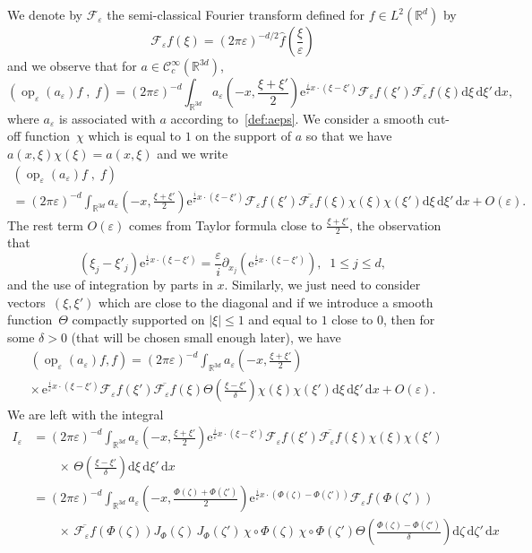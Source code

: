 \documentclass[AHL,Unicode,longabstracts]{cedram}
\DeclareMathOperator{\op}{op}
\newcommand*\R{{\mathbb R}}
\newcommand*\eps{\varepsilon}
\numberwithin{equation}{section}
\newcommand{\ee}{{\mathrm e}}
\newcommand*{\dd}{\mathrm{d}}
\newcommand*{\dx}{\dd x}
\newcommand*{\dxi}{\dd \xi}
\newcommand*{\dzeta}{\dd \zeta}
\begin{document}
We denote by ${\mathcal F}_\eps$ the semi-classical Fourier transform defined for $f\in L^2(\R^d)$ by
\[
{\mathcal F}_\eps f(\xi)=(2\pi\eps)^{-d/2} \widehat f\left(\frac{\xi}{\eps}\right)
\]
and we observe that for $a\in{\mathcal C}_c^\infty(\R^{3d})$,
\[
\left(\op_\eps(a_\eps)f\;,\;f\right)=(2\pi\eps)^{-d} \int_{\R^{3d}} a_\eps\left(-x,\frac{\xi+\xi'}{2}\right) {\ee}^{\frac{i}{\eps} x\cdot (\xi-\xi')}{\mathcal F}_\eps f(\xi')\overline{{\mathcal F}_\eps f}(\xi) \dxi\,\dxi'\,\dx,
\]
where $a_\eps$ is associated with $a$ according to~\eqref{def:aeps}. We consider a smooth cut-off function~$\chi$ which is equal to $1$ on the support of $a$ so that we have $a(x,\xi) \chi(\xi)=a(x,\xi)$ and we write
\begin{multline*}
\left(\op_\eps(a_\eps)f\;,\;f\right)\\
 =
(2\pi\eps)^{-d} \int_{\R^{3d}} a_\eps\left(-x,\frac{\xi+\xi'}{2}\right) {\ee}^{\frac{i}{\eps} x\cdot (\xi-\xi')}{\mathcal F}_\eps f(\xi')\overline{{\mathcal F}_\eps f}(\xi) \chi(\xi)\chi(\xi')\dxi\,\dxi'\,\dx + O(\eps).
\end{multline*}
The rest term $O(\eps)$ comes from Taylor formula close to $\frac{\xi+\xi'}{2}$, the observation that
\[
(\xi_j-\xi'_j) {\ee}^{\frac{i}{\eps} x\cdot (\xi-\xi')}=\frac{ \eps}{i} \partial_{x_j} \left({\ee}^{\frac{i}{\eps} x\cdot (\xi-\xi')}\right),\;\;1\leq j\leq d,
\]
and the use of integration by parts {in $x$}. Similarly, we just need to consider vectors~$(\xi,\xi')$ which are close to the diagonal and if we introduce a smooth function~$\Theta$ compactly supported on $|\xi|\leq 1$ and equal to $1$ close to $0$, then for some $\delta>0$ (that will be chosen small enough later), we have
\begin{multline*}
 \left(\op_\eps(a_\eps)f,f\right)=(2\pi\eps)^{-d} \int_{\R^{3d}} a_\eps\left(-x,\frac{\xi+\xi'}{2}\right) \\
\times\, {\ee}^{\frac{i}{\eps} x\cdot (\xi-\xi')}{\mathcal F}_\eps f(\xi')\overline{{\mathcal F}_\eps f}(\xi) \Theta\left(\frac{\xi-\xi'}{\delta}\right)\chi(\xi)\chi(\xi')\dxi\,\dxi'\,\dx + O(\eps).
\end{multline*}
We are left with the integral
\begin{align*}
I_\eps &= (2\pi\eps)^{-d} \int_{\R^{3d}} a_\eps\left(-x,\frac{\xi+\xi'}{2}\right) {\ee}^{\frac{i}{\eps} x\cdot (\xi-\xi')}{\mathcal F}_\eps f(\xi')\overline{{\mathcal F}_\eps f}(\xi) \chi(\xi)\chi(\xi')\\
& \qquad \times\, \Theta\left(\frac{\xi-\xi'}{\delta}\right)\dxi\,\dxi'\,\dx\\
&= (2\pi\eps)^{-d} \int_{\R^{3d}} a_\eps\left(-x,\frac{\Phi(\zeta)+\Phi(\zeta')}{2}\right) {\ee}^{\frac{i}{\eps} x\cdot (\Phi(\zeta)-\Phi(\zeta'))}{\mathcal F}_\eps f(\Phi(\zeta'))\\
& \qquad \times \,\overline{{\mathcal F}_\eps f}(\Phi(\zeta)) J_\Phi(\zeta)\, J_\Phi(\zeta')\, \chi\circ \Phi(\zeta)\, \chi\circ\Phi(\zeta') \Theta\left(\frac{\Phi(\zeta)-\Phi(\zeta')}{\delta}\right)\dzeta\,\dzeta'\,\dx
\end{align*}
\end{document}
